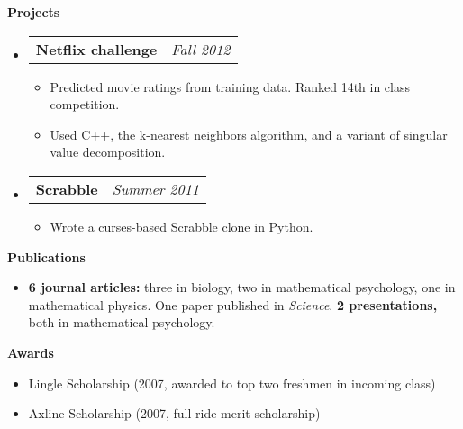 \documentclass[letterpaper,11pt]{article}
\makeatletter
\newcommand{\resitem}[1]{\item #1 \vspace{-2pt}}
\newcommand{\resheading}[1]{{\large \colorbox{mygrey}{\begin{minipage}{\textwidth}{\textbf{#1 \vphantom{p\^{E}}}}\end{minipage}}}}
\newcommand{\ressubheading}[4]{
\begin{tabular*}{7.0in}{l@{\extracolsep{\fill}}r}
		\textbf{#1} & \textit{#4} \\
\end{tabular*}\vspace{-6pt}}
\makeatother
\begin{document}
\resheading{Projects}
\begin{itemize}
\item
	\ressubheading{Netflix challenge}{Pasadena, CA}{Student}{Fall 2012}
	\begin{itemize}
		\resitem{Predicted movie ratings from training data.  Ranked 14th in class competition.}
		\resitem{Used C++, the k-nearest neighbors algorithm, and a variant of singular value decomposition.}
	\end{itemize}
\item
	\ressubheading{Scrabble}{Pasadena, CA}{Self-employed}{Summer 2011}
	\begin{itemize}
		\resitem{Wrote a curses-based Scrabble clone in Python.}
	\end{itemize}
\end{itemize}
\resheading{Publications}
\begin{itemize}
	\item {\bf 6 journal articles:} three in biology, two in mathematical psychology, one in mathematical physics.  One paper published in \emph{Science}.  {\bf 2 presentations,} both in mathematical psychology.
\end{itemize}

\resheading{Awards}
\begin{itemize}
	\item Lingle Scholarship (2007, awarded to top two freshmen in incoming class)
	\item Axline Scholarship (2007, full ride merit scholarship)
\end{itemize}
\end{document}
